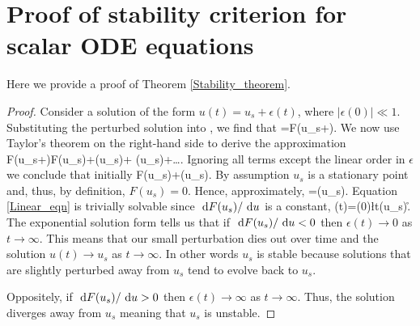 \appendix
\chapter{Proof of stability criterion for scalar ODE equations}\label{Proof of stability criterion for scalar ODE equations}
Here we provide a proof of Theorem \ref{Stability_theorem}.
\begin{proof}
Consider a solution of the form $u(t)=u_s+\epsilon(t)$, where $|\epsilon(0)| \ll 1$. Substituting the perturbed solution into , we find that
\bb
\dot{\epsilon}=F(u_s+\epsilon).
\ee
We now use Taylor's theorem on the right-hand side to derive the approximation
\bb
F(u_s+\epsilon)\approx F(u_s)+\epsilon {}(u_s)+ (u_s)+\dots.
\ee
Ignoring all terms except the linear order in $\epsilon$ we conclude that initially
\bb
\dot{\epsilon}\approx F(u_s)+\epsilon {}(u_s).
\ee
By assumption $u_s$ is a stationary point and, thus, by definition, $F(u_s)=0$. Hence, approximately,
\bb
\dot{\epsilon}=\epsilon {}(u_s).\label{Linear_eqn}
\ee
Equation \eqref{Linear_eqn} is trivially solvable since $\text{ d} F(u_s)/\text{ d} u$ is a constant,
\bb
\epsilon(t)=\epsilon(0)\exp\l t(u_s)\r.
\ee
The exponential solution form tells us that if $\text{ d} F(u_s)/\text{ d} u<0$ then $\epsilon(t)\rightarrow 0$ as $t\rightarrow \infty$. This means that our small perturbation dies out over time and the solution $u(t)\rightarrow u_s$ as $t\rightarrow \infty$. In other words $u_s$ is stable because solutions that are slightly perturbed away from $u_s$ tend to evolve back to $u_s$.

Oppositely, if $\text{ d} F(u_s)/\text{ d} u>0$ then $\epsilon(t)\rightarrow \infty$ as $t\rightarrow \infty$. Thus, the solution diverges away from $u_s$ meaning that $u_s$ is unstable.
\end{proof}




